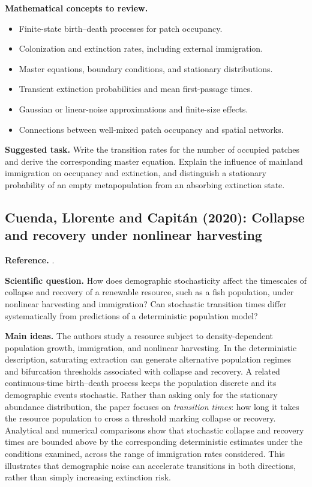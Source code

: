 \medskip\noindent\textbf{Mathematical concepts to review.}
\begin{itemize}
  \item Finite-state birth--death processes for patch occupancy.
  \item Colonization and extinction rates, including external immigration.
  \item Master equations, boundary conditions, and stationary distributions.
  \item Transient extinction probabilities and mean first-passage times.
  \item Gaussian or linear-noise approximations and finite-size effects.
  \item Connections between well-mixed patch occupancy and spatial networks.
\end{itemize}

\noindent\textbf{Suggested task.} Write the transition rates for the
number of occupied patches and derive the corresponding master equation.
Explain the influence of mainland immigration on occupancy and extinction,
and distinguish a stationary probability of an empty metapopulation from an
absorbing extinction state.


\subsection{Cuenda, Llorente and Capit\'an (2020): Collapse and recovery under nonlinear harvesting}
\label{subsec:cuenda-llorente-capitan}
\noindent\textbf{Reference.} \citet{CuendaLlorenteCapitan2020Harvesting}.

\medskip\noindent\textbf{Scientific question.}
How does demographic stochasticity affect the timescales of collapse and
recovery of a renewable resource, such as a fish population, under nonlinear
harvesting and immigration? Can stochastic transition times differ
systematically from predictions of a deterministic population model?

\medskip\noindent\textbf{Main ideas.}
The authors study a resource subject to density-dependent population growth,
immigration, and nonlinear harvesting. In the deterministic description,
saturating extraction can generate alternative population regimes and
bifurcation thresholds associated with collapse and recovery. A related
continuous-time birth--death process keeps the population discrete and its
demographic events stochastic. Rather than asking only for the stationary
abundance distribution, the paper focuses on \emph{transition times}: how
long it takes the resource population to cross a threshold marking collapse
or recovery. Analytical and numerical comparisons show that stochastic
collapse and recovery times are bounded above by the corresponding
deterministic estimates under the conditions examined, across the range of
immigration rates considered. This illustrates that demographic noise can
accelerate transitions in both directions, rather than simply increasing
extinction risk.


